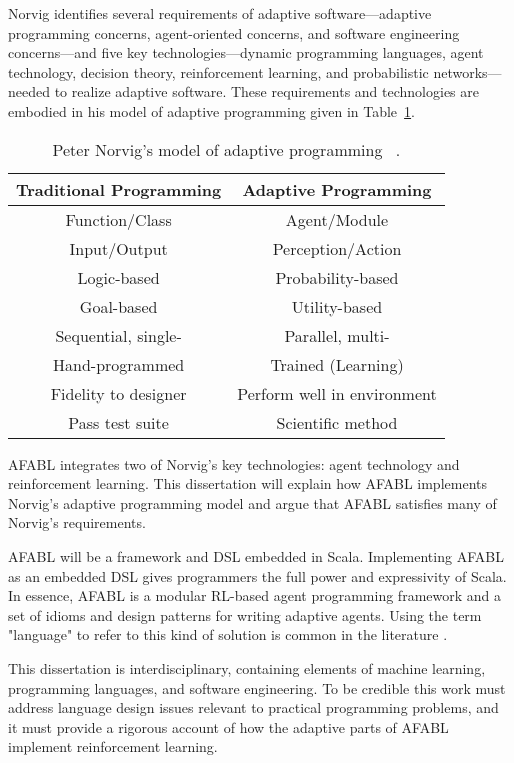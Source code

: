 Norvig identifies several requirements of adaptive soft\-ware---adaptive programming concerns, agent-oriented concerns, and software engineering concerns---and five key technologies---dynamic programming languages, agent technology, decision theory, reinforcement learning, and probabilistic networks---needed to realize adaptive software.  These requirements and technologies are embodied in his model of adaptive programming given in Table~\ref{tab:adaptive-model}.

\begin{table}[h]
\begin{tabular}{|c|c|}\hline
Traditional Programming & Adaptive Programming \\ \hline
Function/Class & Agent/Module \\
Input/Output & Perception/Action \\
Logic-based & Probability-based \\
Goal-based & Utility-based \\
Sequential, single- & Parallel, multi- \\
Hand-programmed & Trained (Learning) \\
Fidelity to designer & Perform well in environment \\
Pass test suite & Scientific method\\ \hline
\end{tabular}
\caption{Peter Norvig's model of adaptive programming
  ~\cite{norvig1998decision}.}
\label{tab:adaptive-model}
\end{table}

AFABL integrates two of Norvig's key technologies: agent technology and reinforcement learning.  This dissertation will explain how AFABL implements Norvig's adaptive programming model and argue that AFABL satisfies many of Norvig's requirements.

AFABL will be a framework and DSL embedded in Scala.  Implementing AFABL as an embedded DSL gives programmers the full power and expressivity of Scala.  In essence, AFABL is a modular RL-based agent programming framework and a set of idioms and design patterns for writing adaptive agents.  Using the term "language" to refer to this kind of solution is common in the literature \cite{andre2002state}.

This dissertation is interdisciplinary, containing elements of machine learning, programming languages, and software engineering.  To be credible this work must address language design issues relevant to practical programming problems, and it must provide a rigorous account of how the adaptive parts of AFABL implement reinforcement learning.


